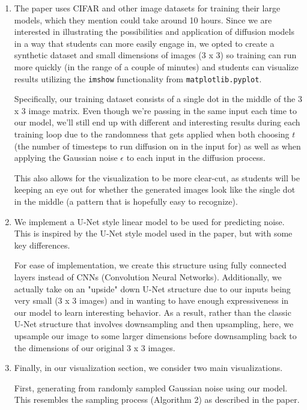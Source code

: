 \documentclass{article}
\begin{document}
\begin{enumerate}
    \item
    The paper uses CIFAR and other image datasets for training their large models, which they mention could take around 10 hours. Since we are interested in illustrating the possibilities and application of diffusion models in a way that students can more easily engage in, we opted to create a synthetic dataset and small dimensions of images (3 x 3) so training can run more quickly (in the range of a couple of minutes) and students can visualize results utilizing the \verb|imshow| functionality from \verb|matplotlib.pyplot|.
    
    Specifically, our training dataset consists of a single dot in the middle of the 3 x 3 image matrix. Even though we're passing in the same input each time to our model, we'll still end up with different and interesting results during each training loop due to the randomness that gets applied when both choosing $t$ (the number of timesteps to run diffusion on in the input for) as well as when applying the Gaussian noise $\epsilon$ to each input in the diffusion process.

    This also allows for the visualization to be more clear-cut, as students will be keeping an eye out for whether the generated images look like the single dot in the middle (a pattern that is hopefully easy to recognize).
    
    \item
    We implement a U-Net style linear model to be used for predicting noise. This is inspired by the U-Net style model used in the paper, but with some key differences.
    
    For ease of implementation, we create this structure using fully connected layers instead of CNNs (Convolution Neural Networks). Additionally, we actually take on an "upside" down U-Net structure due to our inputs being very small (3 x 3 images) and in wanting to have enough expressiveness in our model to learn interesting behavior. As a result, rather than the classic U-Net structure that involves downsampling and then upsampling, here, we upsample our image to some larger dimensions before downsampling back to the dimensions of our original 3 x 3 images.

    \item
    Finally, in our visualization section, we consider two main visualizations.
    
    First, generating from randomly sampled Gaussian noise using our model. This resembles the sampling process (Algorithm 2) as described in the paper.
    

\end{enumerate}
\end{document}
